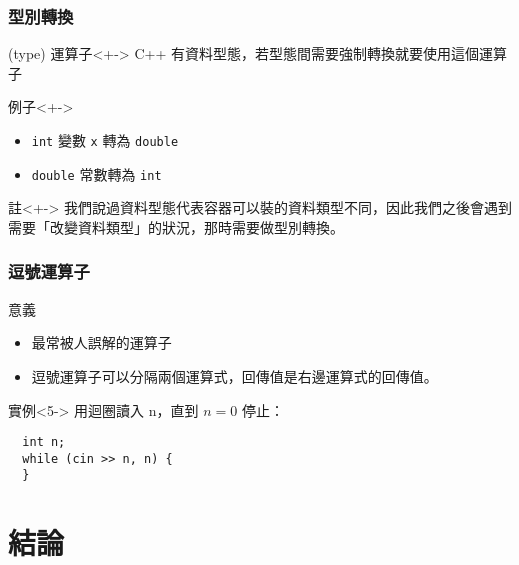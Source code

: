 \documentclass[utf8]{beamer}
\begin{document}
\begin{CJK}{UTF8}{bkai}
\begin{frame}[fragile]
  \frametitle{型別轉換}
  \begin{block}{(type) 運算子}<+->
  C++ 有資料型態，若型態間需要\alert{強制轉換}就要使用這個運算子
  \end{block}
  \begin{exampleblock}{例子}<+->
    \begin{itemize}
    \item \lstinline{int}{} 變數 \lstinline{x}{} 轉為 \lstinline{double}{} %
    \item<+-> \lstinline{double}{} 常數轉為 \lstinline{int}{} %
    \end{itemize}
  \end{exampleblock}
  \begin{alertblock}{註}<+->
  我們說過資料型態代表容器可以裝的資料類型不同，因此我們之後會遇到需要「\alert{改變資料類型}」的狀況，那時需要做型別轉換。
  \end{alertblock}
\end{frame}

\begin{frame}[fragile]
  \frametitle{逗號運算子}
  \begin{block}{意義}
    \begin{itemize}
    \item 最常被人誤解的\alert{運算子}
    \item<4-> 逗號運算子可以\alert{分隔}兩個運算式，回傳值是\alert{右邊}運算式的回傳值。
    \end{itemize}
  \end{block}
  \begin{exampleblock}{實例}<5->
  用迴圈讀入 n，直到 $n=0$ 停止：
    \pause \pause \pause \pause \pause
    \begin{lstlisting}
  int n;
  while (cin >> n, n) {
  }
    \end{lstlisting}
  \end{exampleblock}
\end{frame}

\section{結論}


\end{CJK}
\end{document}
